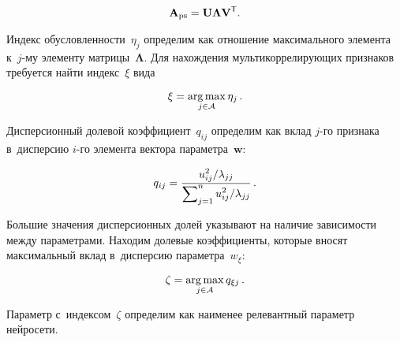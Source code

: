 \begin{multicols}{2}
\vspace*{3pt}

\noindent
\begin{equation*}
\mathbf{A}_{\mathrm{ps}} = \mathbf{U}{\bf\Lambda}\mathbf{V}^{\mathsf{T}}. 
\end{equation*}

\vspace*{-2pt}

\noindent
Индекс обусловленности~$\eta_{j}$ определим как отношение максимального 
элемента к~$j$-му элементу мат\-ри\-цы~$\mathbf{\Lambda}$. Для
 нахождения муль\-ти\-кор\-ре\-ли\-ру\-ющих 
признаков требуется найти индекс~$\xi$ вида

\vspace*{2pt}

\noindent
\begin{equation*}
\xi = \mathop{\mathrm{arg}\,\mathrm{max}}\limits_{j\in \mathcal{A}}{\eta_j}\,. 
\end{equation*}

\vspace*{-2pt}


Дисперсионный долевой коэффициент~$q_{ij}$ определим как вклад $j$-го признака 
в~дис\-пер\-сию $i$-го элемента вектора па\-ра\-мет\-ра~$\mathbf{w}$:

\vspace*{3pt}

\noindent
\begin{equation*}
q_{ij} = \displaystyle\frac{\displaystyle u^2_{ij}/\lambda_{jj}\mathstrut}{\displaystyle \sum\nolimits^n_{j=1}{u^2_{ij}/\lambda_{jj}}\mathstrut}\,. 
\end{equation*}

\vspace*{-2pt}

Большие значения дисперсионных долей указывают на наличие зависимости между 
параметрами. Находим долевые коэффициенты, которые вносят максимальный вклад 
в~дис\-пер\-сию па\-ра\-мет\-ра~$w_\xi$:

\vspace*{2pt}

\noindent
\begin{equation*}
\zeta = \mathop{\mathrm{arg}\,\mathrm{max}}\limits_{j\in \mathcal{A}} q_{\xi j}\,. 
\end{equation*}

\vspace*{-2pt}

\noindent
Параметр с~индексом~$\zeta$ определим как наименее релевантный параметр 
нейросети.





\end{multicols}
